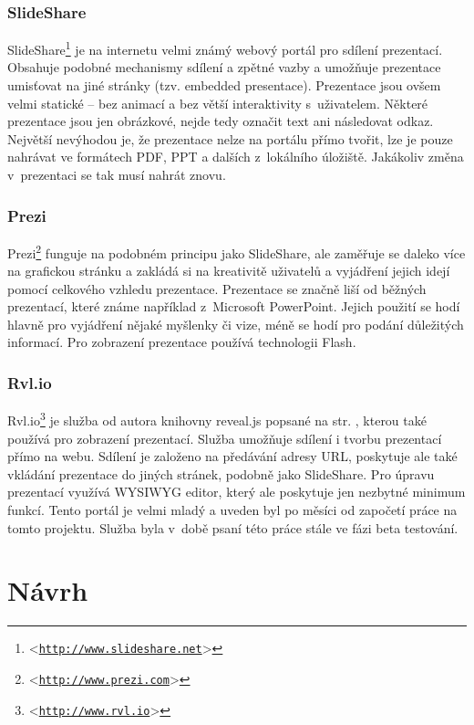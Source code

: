 \documentclass[11pt,twoside,a4paper]{book}
\let\oldUrl\url									%
\renewcommand\url[1]{<\texttt{\oldUrl{#1}}>}
\begin{document}
\subsection{SlideShare}
SlideShare\footnote{\url{http://www.slideshare.net}} je na internetu velmi známý webový portál pro sdílení prezentací. Obsahuje podobné mechanismy sdílení a zpětné vazby a umožňuje prezentace umisťovat na jiné stránky (tzv. embedded presentace). Prezentace jsou ovšem velmi statické – bez animací a bez větší interaktivity s~uživatelem. Některé prezentace jsou jen obrázkové, nejde tedy označit text ani následovat odkaz. Největší nevýhodou je, že prezentace nelze na portálu přímo tvořit, lze je pouze nahrávat ve formátech PDF, PPT a dalších z~lokálního úložiště. Jakákoliv změna v~prezentaci se tak musí nahrát znovu.

\subsection{Prezi}
Prezi\footnote{\url{http://www.prezi.com}} funguje na podobném principu jako SlideShare, ale zaměřuje se daleko více na grafickou stránku a zakládá si na kreativitě uživatelů a vyjádření jejich idejí pomocí celkového vzhledu prezentace. Prezentace se značně liší od běžných prezentací, které známe například z~Microsoft PowerPoint. Jejich použití se hodí hlavně pro vyjádření nějaké myšlenky či vize, méně se hodí pro podání důležitých informací. Pro zobrazení prezentace používá technologii Flash.

\subsection{Rvl.io}
Rvl.io\footnote{\url{http://www.rvl.io}} je služba od autora knihovny reveal.js popsané na str. \pageref{chap:revealjs}, kterou také používá pro zobrazení prezentací. Služba umožňuje sdílení i tvorbu prezentací přímo na webu. Sdílení je založeno na předávání adresy URL, poskytuje ale také vkládání prezentace do jiných stránek, podobně jako SlideShare. Pro úpravu prezentací využívá WYSIWYG editor, který ale poskytuje jen nezbytné minimum funkcí. Tento portál je velmi mladý a uveden byl po měsíci od započetí práce na tomto projektu. Služba byla v~době psaní této práce stále ve fázi beta testování.




\chapter{Návrh}
\end{document}

